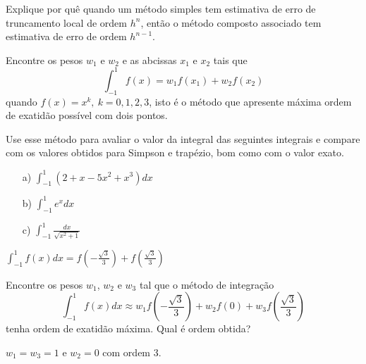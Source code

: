 \begin{Exercise} Explique por quê quando um método simples tem estimativa de erro de truncamento local de ordem $h^n$, então o método composto associado tem estimativa de erro de ordem $h^{n-1}$.
\end{Exercise}

\begin{Exercise} Encontre os pesos $w_1$ e $w_2$ e as abcissas $x_1$ e $x_2$ tais que
$$\int_{-1}^1f(x)=w_1f(x_1)+w_2f(x_2)$$
quando $f(x)=x^k, ~k=0,1,2,3$, isto é o método que apresente máxima ordem de exatidão possível com dois pontos.

Use esse método para avaliar o valor da integral das seguintes integrais e compare com os valores obtidos para Simpson e trapézio, bom como com o valor exato.
\begin{itemize}
\item[a)] $\int_{-1}^1\left(2+x-5x^2+x^3\right)dx$
\item[b)] $\int_{-1}^1e^{x}dx$
\item[c)] $\int_{-1}^1\frac{dx}{\sqrt{x^2+1}}$
\end{itemize}
\end{Exercise}
\begin{Answer}
  \begin{tiny}
$\int_{-1}^1f(x)dx=f\left(-\frac{\sqrt{3}}{3}\right)+f\left(\frac{\sqrt{3}}{3}\right)$    
  \end{tiny}
\end{Answer}


\begin{Exercise} Encontre os pesos $w_1$, $w_2$ e $w_3$ tal que o método de integração
$$\int_{-1}^1 f(x)dx \approx w_1 f\left(-\frac{\sqrt{3}}{3}\right)  + w_2f(0) + w_3f\left(\frac{\sqrt{3}}{3}\right)$$
tenha ordem de exatidão máxima. Qual é ordem obtida?
\end{Exercise}
\begin{Answer}
  \begin{tiny}
$w_1=w_3=1$ e $w_2=0$ com ordem 3.    
  \end{tiny}
\end{Answer}


% 